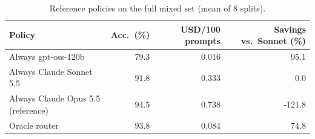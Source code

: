 \begin{table}[!htbp]
\centering\small
\caption{Reference policies on the full mixed set (mean of 8 splits).}\label{tab:ref_full}
\begin{tabular}{lrrr}
\toprule
Policy & Acc.\ (\%) & USD/100 prompts & Savings vs.\ Sonnet (\%) \\
\midrule
Always gpt-oss-120b & 79.3 & 0.016 & 95.1 \\
Always Claude Sonnet 5.5 & 91.8 & 0.333 & 0.0 \\
Always Claude Opus 5.5 (reference) & 94.5 & 0.738 & -121.8 \\
Oracle router & 93.8 & 0.084 & 74.8 \\
\bottomrule
\end{tabular}
\end{table}
